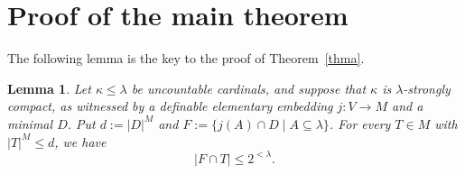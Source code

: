 \documentclass[10pt,a4paper]{amsart}
\newtheorem{lemma}[thm]{Lemma}
\theoremstyle{definition}
\theoremstyle{remark}
\renewcommand{\mid}{\mathrel{|}\allowbreak}
\begin{document}
\section{Proof of the main theorem}\label{sec:count}

The following lemma is the key to the proof of Theorem~\ref{thma}.

\begin{lemma}\label{lcapacity}
    Let $\kappa\le\lambda$ be uncountable cardinals,
    and suppose that $\kappa$ is $\lambda$-strongly compact,
    as witnessed by a definable elementary embedding $j:V\rightarrow M$ and a minimal $D$.
    Put $d:=|D|^M$ and $F:=\{j(A)\cap D\mid A\subseteq\lambda\}$.
    For every $T\in M$ with $|T|^M\le d$, we have
    \begin{equation}\label{eq1}
        |F \cap T|\le 2^{<\lambda}.
    \end{equation}
\end{lemma}
\end{document}
